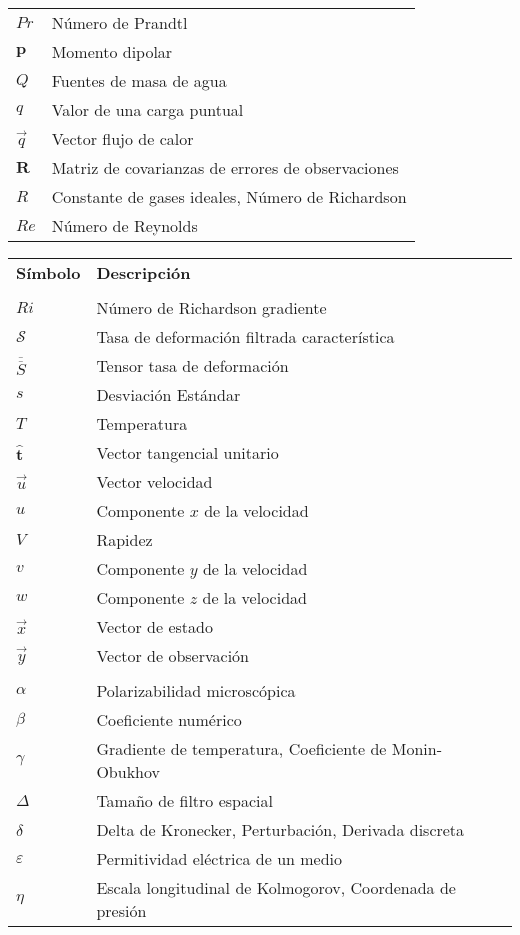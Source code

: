 \begin{tabular}{ll}
	$Pr$ & Número de Prandtl    \\
	$\mathbf{p}$ & Momento dipolar     \\
	$Q$ & Fuentes de masa de agua     \\
	$q$ & Valor de una carga puntual   \\
	$\vec{q}$ &  Vector flujo de calor   \\
	$\textbf{R}$ & Matriz de covarianzas de errores de observaciones \\
	$R$ &   Constante de gases ideales, Número de Richardson   \\
	$Re$ & Número de Reynolds    \\
\end{tabular}
\newpage
\begin{tabular}{ll}
	\textbf{Símbolo} & \textbf{Descripción} \\
	& \\
	$Ri$ & Número de Richardson gradiente  \\
	$\mathcal{S}$ & Tasa de deformación filtrada característica\\
	$\overline{\overline{S}}$ & Tensor tasa de deformación    \\
	$s$ & Desviación Estándar \\
	$T$ &   Temperatura  \\
	$\hat{\mathbf{t}}$ & Vector tangencial unitario \\
	$\vec u$ & Vector velocidad     \\
	$u$ & Componente $x$ de la velocidad \\
	$V$ & Rapidez     \\
	$v$ & Componente $y$ de la velocidad  \\
	$w$ & Componente $z$ de la velocidad  \\
	$\vec{x}$ & Vector de estado \\
	$\vec{y}$ & Vector de observación \\
	& \\
	$\alpha$ &  Polarizabilidad microscópica    \\
	$\beta$ & Coeficiente numérico  \\
	$\gamma$ &  Gradiente de temperatura, Coeficiente de Monin-Obukhov  \\
	$\Delta$ & Tamaño de filtro espacial  \\
	$\delta$ & Delta de Kronecker, Perturbación, Derivada discreta     \\
	$\varepsilon$ & Permitividad eléctrica de un medio \\
	$\eta$ & Escala longitudinal de Kolmogorov, Coordenada de presión \\

\end{tabular}
